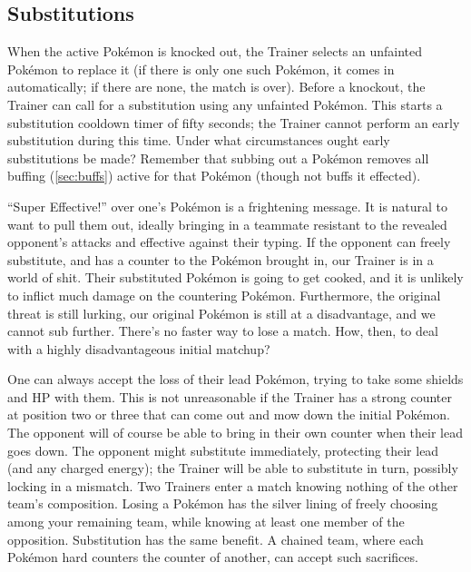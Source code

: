 \subsection{Substitutions\label{subsec:substitutions}}
When the active Pokémon is knocked out, the Trainer selects an unfainted
  Pokémon to replace it (if there is only one such Pokémon, it comes in
  automatically; if there are none, the match is over).
Before a knockout, the Trainer can call for a substitution using any
  unfainted Pokémon.
This starts a substitution cooldown timer of fifty seconds; the Trainer
  cannot perform an early substitution during this time.
Under what circumstances ought early substitutions be made?
Remember that subbing out a Pokémon removes all buffing (\autoref{sec:buffs})
  active for that Pokémon (though not buffs it effected).

``Super Effective!'' over one's Pokémon is a frightening message.
It is natural to want to pull them out, ideally bringing in a teammate resistant
  to the revealed opponent's attacks and effective against their typing.
If the opponent can freely substitute, and has a counter to the Pokémon brought in,
  our Trainer is in a world of shit.
Their substituted Pokémon is going to get cooked, and it is unlikely to inflict much damage on the countering Pokémon.
Furthermore, the original threat is still lurking, our original Pokémon is still at a disadvantage,
 and we cannot sub further.
There's no faster way to lose a match.
How, then, to deal with a highly disadvantageous initial matchup?

One can always accept the loss of their lead Pokémon, trying to take some shields and HP with them.
This is not unreasonable if the Trainer has a strong counter at position two or three
  that can come out and mow down the initial Pokémon.
The opponent will of course be able to bring in their own counter when their lead goes down.
The opponent might substitute immediately, protecting their lead (and any charged energy); the Trainer will be able to substitute in turn, possibly locking in a mismatch.
Two Trainers enter a match knowing nothing of the other team's composition.
Losing a Pokémon has the silver lining of freely choosing among your remaining team,
  while knowing at least one member of the opposition.
Substitution has the same benefit.
A chained team, where each Pokémon hard counters the counter of another, can accept such sacrifices.


